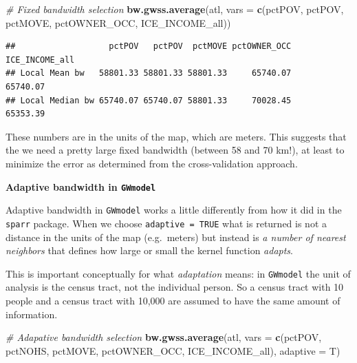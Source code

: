 \documentclass[
]{book}
\newenvironment{Shaded}{\begin{snugshade}}{\end{snugshade}}
\newcommand{\AttributeTok}[1]{\textcolor[rgb]{0.13,0.29,0.53}{#1}}
\newcommand{\CommentTok}[1]{\textcolor[rgb]{0.56,0.35,0.01}{\textit{#1}}}
\newcommand{\FunctionTok}[1]{\textcolor[rgb]{0.13,0.29,0.53}{\textbf{#1}}}
\newcommand{\NormalTok}[1]{#1}
\newcommand{\StringTok}[1]{\textcolor[rgb]{0.31,0.60,0.02}{#1}}
\newenvironment{rmdnote}[1]
  {
  \begin{itemize}
  \renewcommand{\labelitemi}{
    \raisebox{-.7\height}[0pt][0pt]{
      {\setkeys{Gin}{width=3em,keepaspectratio}\texttt{[image: images/\#1]}}
    }
  }
  \setlength{\fboxsep}{1em}
  \begin{note}
  \item
  }
  {
  \end{note}
  \end{itemize}
  }
\begin{document}
\begin{Shaded}
\begin{Highlighting}[]
\CommentTok{\# Fixed bandwidth selection}
\FunctionTok{bw.gwss.average}\NormalTok{(atl, }\AttributeTok{vars =} \FunctionTok{c}\NormalTok{(}\StringTok{\textquotesingle{}pctPOV\textquotesingle{}}\NormalTok{, }\StringTok{\textquotesingle{}pctPOV\textquotesingle{}}\NormalTok{, }\StringTok{\textquotesingle{}pctMOVE\textquotesingle{}}\NormalTok{, }
                              \StringTok{\textquotesingle{}pctOWNER\_OCC\textquotesingle{}}\NormalTok{, }\StringTok{\textquotesingle{}ICE\_INCOME\_all\textquotesingle{}}\NormalTok{))}
\end{Highlighting}
\end{Shaded}

\begin{verbatim}
##                   pctPOV   pctPOV  pctMOVE pctOWNER_OCC ICE_INCOME_all
## Local Mean bw   58801.33 58801.33 58801.33     65740.07       65740.07
## Local Median bw 65740.07 65740.07 58801.33     70028.45       65353.39
\end{verbatim}

These numbers are in the units of the map, which are meters. This suggests that the we need a pretty large fixed bandwidth (between 58 and 70 km!), at least to minimize the error as determined from the cross-validation approach.

\begin{rmdnote}{note}
\textbf{Adaptive bandwidth in \texttt{GWmodel}}

Adaptive bandwidth in \texttt{GWmodel} works a little differently from how it did in the \texttt{sparr} package. When we choose \texttt{adaptive\ =\ TRUE} what is returned is not a distance in the units of the map (e.g.~meters) but instead is \emph{a number of nearest neighbors} that defines how large or small the kernel function \emph{adapts}.

This is important conceptually for what \emph{adaptation} means: in \texttt{GWmodel} the unit of analysis is the census tract, not the individual person. So a census tract with 10 people and a census tract with 10,000 are assumed to have the same amount of information.

\end{rmdnote}

\begin{Shaded}
\begin{Highlighting}[]
\CommentTok{\# Adapative bandwidth selection}
\FunctionTok{bw.gwss.average}\NormalTok{(atl, }\AttributeTok{vars =} \FunctionTok{c}\NormalTok{(}\StringTok{\textquotesingle{}pctPOV\textquotesingle{}}\NormalTok{, }\StringTok{\textquotesingle{}pctNOHS\textquotesingle{}}\NormalTok{, }\StringTok{\textquotesingle{}pctMOVE\textquotesingle{}}\NormalTok{, }
                              \StringTok{\textquotesingle{}pctOWNER\_OCC\textquotesingle{}}\NormalTok{, }\StringTok{\textquotesingle{}ICE\_INCOME\_all\textquotesingle{}}\NormalTok{),}
                \AttributeTok{adaptive =}\NormalTok{ T)}
\end{Highlighting}
\end{Shaded}
\end{document}
